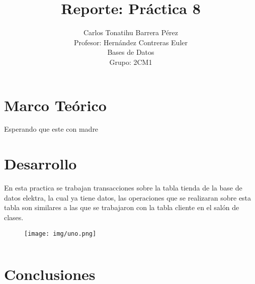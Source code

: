 \documentclass[12pt, titlepage]{article}
\title{Reporte: Práctica 8}
\author{Carlos Tonatihu Barrera Pérez \\ Profesor: Hernández Contreras Euler \\ Bases de Datos \\ Grupo: 2CM1 }
\begin{document}
	\maketitle
	\tableofcontents
	\section{Marco Teórico}
	Esperando que este con madre
	\section{Desarrollo}
	En esta practica se trabajan transacciones sobre la tabla tienda de la base de datos elektra, la cual ya tiene datos, las operaciones que se realizaran sobre esta tabla son similares a las que se trabajaron con la tabla cliente en el salón de clases.
	\begin{figure}[H]
		\begin{center}
			\texttt{[image: img/uno.png]}
			\label{fig:uno}
			\caption{}
		\end{center}
	\end{figure}
	\begin{lstlisting}
	\end{lstlisting}

	\section{Conclusiones}
	 
	
\end{document}
